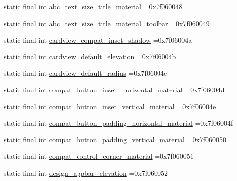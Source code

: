 \begin{DoxyCompactItemize}
\item 
static final int \mbox{\hyperlink{classbr_1_1unb_1_1cic_1_1mp_1_1marketmaster_1_1test_1_1R_1_1dimen_a40fdedc8156cc6748744654d37a9ab29}{abc\+\_\+text\+\_\+size\+\_\+title\+\_\+material}} =0x7f060048
\item 
static final int \mbox{\hyperlink{classbr_1_1unb_1_1cic_1_1mp_1_1marketmaster_1_1test_1_1R_1_1dimen_ae5f3b75bb22f03e38fa92deec829b3f2}{abc\+\_\+text\+\_\+size\+\_\+title\+\_\+material\+\_\+toolbar}} =0x7f060049
\item 
static final int \mbox{\hyperlink{classbr_1_1unb_1_1cic_1_1mp_1_1marketmaster_1_1test_1_1R_1_1dimen_a8d3c767c6486b487fe14374f6bb1a63d}{cardview\+\_\+compat\+\_\+inset\+\_\+shadow}} =0x7f06004a
\item 
static final int \mbox{\hyperlink{classbr_1_1unb_1_1cic_1_1mp_1_1marketmaster_1_1test_1_1R_1_1dimen_a79fed2648f0a62215c91d93b13d00734}{cardview\+\_\+default\+\_\+elevation}} =0x7f06004b
\item 
static final int \mbox{\hyperlink{classbr_1_1unb_1_1cic_1_1mp_1_1marketmaster_1_1test_1_1R_1_1dimen_af83743fcf2d63cc42bcd77fcf02c72c8}{cardview\+\_\+default\+\_\+radius}} =0x7f06004c
\item 
static final int \mbox{\hyperlink{classbr_1_1unb_1_1cic_1_1mp_1_1marketmaster_1_1test_1_1R_1_1dimen_ad4500cf1f7370a6985475f95a16df55f}{compat\+\_\+button\+\_\+inset\+\_\+horizontal\+\_\+material}} =0x7f06004d
\item 
static final int \mbox{\hyperlink{classbr_1_1unb_1_1cic_1_1mp_1_1marketmaster_1_1test_1_1R_1_1dimen_a2590cd8b96727ac89ed4f6a11b073f42}{compat\+\_\+button\+\_\+inset\+\_\+vertical\+\_\+material}} =0x7f06004e
\item 
static final int \mbox{\hyperlink{classbr_1_1unb_1_1cic_1_1mp_1_1marketmaster_1_1test_1_1R_1_1dimen_aae71ec9a31bce3b6a86520e79dfbdbc8}{compat\+\_\+button\+\_\+padding\+\_\+horizontal\+\_\+material}} =0x7f06004f
\item 
static final int \mbox{\hyperlink{classbr_1_1unb_1_1cic_1_1mp_1_1marketmaster_1_1test_1_1R_1_1dimen_aa92faab39f211d17178aa4021cd40266}{compat\+\_\+button\+\_\+padding\+\_\+vertical\+\_\+material}} =0x7f060050
\item 
static final int \mbox{\hyperlink{classbr_1_1unb_1_1cic_1_1mp_1_1marketmaster_1_1test_1_1R_1_1dimen_a95ccd54d0b482cfdcea33052d501a8fe}{compat\+\_\+control\+\_\+corner\+\_\+material}} =0x7f060051
\item 
static final int \mbox{\hyperlink{classbr_1_1unb_1_1cic_1_1mp_1_1marketmaster_1_1test_1_1R_1_1dimen_a75d332345ac8c7c47d053f237fc14d69}{design\+\_\+appbar\+\_\+elevation}} =0x7f060052

\end{DoxyCompactItemize}
